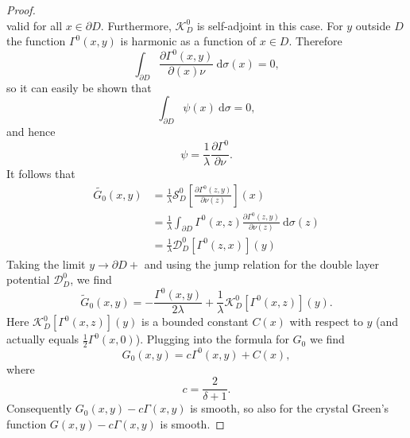 \documentclass[a4paper]{article}
\theoremstyle{definition}
\renewcommand{\S}{\mathcal{S}}
\newcommand{\K}{\mathcal{K}}
\newcommand{\dx}{\: \mathrm{d}}
\begin{document}
\begin{proof}
\begin{equation*}
\end{equation*}
valid for all $x\in \partial D$. Furthermore, $\K_D^0$ is self-adjoint in this case. For $y$ outside $D$ the function $\Gamma^0(x,y)$ is harmonic as a function of $x\in D$. Therefore 
\begin{equation*}
\int_{\partial D} \frac{\partial \Gamma^0(x,y)}{\partial(x) \nu}\dx \sigma(x) = 0,
\end{equation*}
so it can easily be shown that 
\begin{equation*}
\int_{\partial D} \psi(x)\dx \sigma = 0,
\end{equation*}
and hence 
\begin{equation*}
\psi = \frac{1}{\lambda}\frac{\partial \Gamma^0}{\partial \nu}.
\end{equation*}
It follows that 
\begin{align*}
\tilde{G_0}(x,y) &= \frac{1}{\lambda}\S_D^0 \left[\frac{\partial \Gamma^0(z,y)}{\partial \nu(z)} \right](x) \\
&= \frac{1}{\lambda} \int_{\partial D} \Gamma^0(x,z) \frac{\partial \Gamma^0(z,y)}{\partial \nu(z)} \dx \sigma(z) \\
&=\frac{1}{\lambda}\mathcal{D}_D^0 \left[\Gamma^0(z,x)\right](y)
\end{align*}
Taking the limit $y\rightarrow \partial D+$ and using the jump relation for the double layer potential $\mathcal{D}_D^0$, we find
\begin{equation*}
\tilde{G}_0(x,y) = -\frac{\Gamma^0(x,y)}{2\lambda} + \frac{1}{\lambda}\K_D^0\left[\Gamma^0(x,z)\right](y).
\end{equation*}
Here $\K_D^0\left[\Gamma^0(x,z)\right](y)$ is a bounded constant $C(x)$ with respect to $y$ (and actually equals $\frac{1}{2}\Gamma^0(x,0)$). Plugging into the formula for $G_0$ we find
\begin{equation*}
G_0(x,y) = c\Gamma^0(x,y) + C(x),
\end{equation*}
where 
\begin{equation*}
c = \frac{2}{\delta+1}.
\end{equation*}
Consequently $G_0(x,y)-c\Gamma(x,y)$ is smooth, so also for the crystal Green's function $G(x,y)-c\Gamma(x,y)$ is smooth. 


\end{proof}
\end{document}
